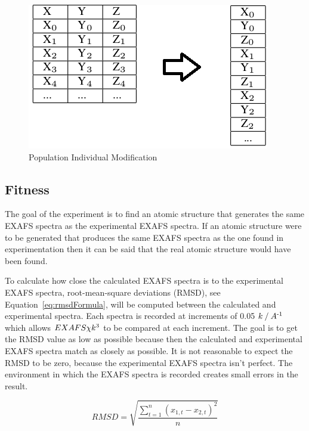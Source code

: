 \documentclass[conference]{IEEEtran}
\begin{document}
\begin{figure}
  \begin{center}
    \includegraphics[bb=0 0 400 241,scale=0.5]{refs/ThisBecomesThat.png}
  \end{center}
  \caption{Population Individual Modification}
  \label{fig:postOpExplain}
\end{figure}

\subsection{Fitness}

The goal of the experiment is to find an atomic structure that generates the same EXAFS spectra as the experimental EXAFS spectra. If an atomic structure were to be generated that produces the same EXAFS spectra as the one found in experimentation then it can be said that the real atomic structure would have been found.

To calculate how close the calculated EXAFS spectra is to the experimental EXAFS spectra, root-mean-square deviations (RMSD), see Equation~\ref{eq:rmsdFormula}, will be computed between the calculated and experimental spectra. Each spectra is recorded at increments of 0.05 $k \mathbin{/} A\textsuperscript{-1}$ which allows $EXAFS \chi k\textsuperscript{3}$ to be compared at each increment. The goal is to get the RMSD value as low as possible because then the calculated and experimental EXAFS spectra match as closely as possible. It is not reasonable to expect the RMSD to be zero, because the experimental EXAFS spectra isn't perfect. The environment in which the EXAFS spectra is recorded creates small errors in the result.

\begin{equation}
  \label{eq:rmsdFormula}
  RMSD = \sqrt{\frac{\sum_{t=1}^{n} \left ( x_{1,t}-x_{2,t} \right )^{2}}{n}}
\end{equation}
\end{document}
